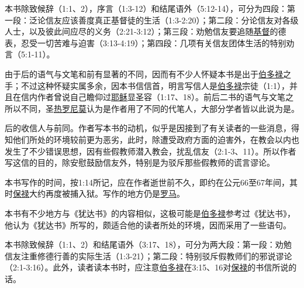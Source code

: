 本书除致候辞（1:1、2），序言（1:3-12）和结尾语外（5:12-14），可分为四段：第一段：泛论信友应该善度真正基督徒的生活（1:3-2:20）；第二段：分论信友对各级人士，以及彼此间应尽的义务（2:21-3:12）；第三段：劝勉信友要追随\uline{基督}的德表，忍受一切苦难与迫害（3:13-4:19）；第四段：几项有关信友团体生活的特别劝言（5:1-11）。


由于后的语气与文笔和前有显著的不同，因而有不少人怀疑本书是出于\uline{伯多禄}之手；不过这种怀疑实属多余，因本书信信首，明言写信人是\uline{伯多禄}宗徒（1:1），并且在信内作者曾说自己瞻仰过\uline{耶稣}显圣容（1:17、18）。前后二书的语气与文笔之所以不同，圣\uline{热罗尼莫}认为是作者用了不同的代笔人，大部分学者皆以此说为是。

后的收信人与前同。作者写本书的动机，似乎是因接到了有关读者的一些消息，得知他们所处的环境较前更为恶劣，此时，除遭受政府方面的迫害外，在教会以内也发生了不少错误思想，因有些假教师潜入教会，扰乱信友（2:1-3、11）。所以作者写这信的目的，除安慰鼓励信友外，特别是为驳斥那些假教师的谎言谬论。

本书写作的时间，按1:14所记，应在作者逝世前不久，即约在公元66至67年间，其时\uline{保禄}大约再度被捕入狱。写作的地方仍是\uline{罗马}。

本书有不少地方与《犹达书》的内容相似，这极可能是\uline{伯多禄}参考过《犹达书》，他认为《犹达书》所写的，颇适合他的读者所处的环境，因而采用了一些语句。

本书除致候辞（1:1、2）和结尾语外（3:17、18），可分为两大段：第一段：劝勉信友注重修德行善的实际生活（1:3-21）；第二段：特别驳斥假教师们的邪说谬论（2:1-3:16）。此外，读者读本书时，应注意\uline{伯多禄}在3:15、16对\uline{保禄}的书信所说的话。
